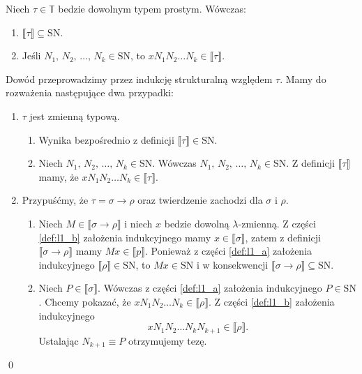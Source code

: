 \begin{lemat}\label{thm:sn_lemat1}
  Niech \(\tau\in\mathbb{T}\) bedzie dowolnym typem prostym. Wówczas:
  \begin{enumerate}[label=(\arabic*)]
    \setlength\itemsep{0em}
    \item \(\llbracket \tau \rrbracket  \subseteq \mathrm{SN}\).\label{def:l1_a}
    \item Jeśli \(N_1,\,N_2,\,\dots,\,N_k\in\mathrm{SN}\), to \(xN_1 N_2 \dots N_k \in \llbracket \tau \rrbracket\).\label{def:l1_b}
  \end{enumerate}
\end{lemat}
\begin{dowod}
  Dowód przeprowadzimy przez indukcję strukturalną względem \(\tau\). Mamy do rozważenia następujące dwa przypadki:
  \begin{enumerate}[label=(\alph*)]
    \setlength\itemsep{0em}
    \item \(\tau\) jest zmienną typową.
     \begin{enumerate}[label=(\arabic*)]
      \setlength\itemsep{0em}
     
        \item Wynika bezpośrednio z definicji \(\llbracket \tau \rrbracket\in \mathrm{SN}\). 
         
        \item Niech \(N_1,\,N_2,\,\dots,\,N_k \in \mathrm{SN}\). Wówczas \(N_1,\,N_2,\,\dots,\,N_k\in\mathrm{SN}\). Z definicji \(\llbracket \tau \rrbracket\) mamy, że \(xN_1 N_2 \dots N_k \in\llbracket \tau \rrbracket\).
      \end{enumerate}

    \item Przypuśćmy, że \(\tau=\sigma\to\rho\) oraz twierdzenie zachodzi dla \(\sigma\) i \(\rho\).
    \begin{enumerate}[label=(\arabic*)]
    \setlength\itemsep{0em}

    \item Niech \(M\in\llbracket \sigma \to \rho\rrbracket\) i niech \(x\) bedzie dowolną \(\lambda\)-zmienną. Z części \ref{def:l1_b} założenia indukcyjnego mamy \(x\in\llbracket \sigma \rrbracket\), zatem z definicji \(\llbracket \sigma\to\rho\rrbracket\) mamy \(Mx\in\llbracket p\rrbracket\). Ponieważ z części \ref{def:l1_a} założenia indukcyjnego \(\llbracket\rho\rrbracket\in\mathrm{SN}\), to \(Mx\in\mathrm{SN}\) i w konsekwencji \(\llbracket\sigma\to\rho\rrbracket\subseteq \mathrm{SN}\).
    \item Niech \(P\in\llbracket \sigma \rrbracket\). Wówczas z części \ref{def:l1_a} założenia indukcyjnego \(P\in\mathrm{SN}\). Chcemy pokazać, że \(xN_1 N_2 \dots N_k \in \llbracket \rho \rrbracket\). Z części \ref{def:l1_b} założenia indukcyjnego \[xN_1 N_2 \dots N_k N_{k+1} \in \llbracket \rho \rrbracket.\] Ustalając \(N_{k+1}\equiv P\) otrzymujemy tezę.
     \end{enumerate}
  \end{enumerate}
  \qed
\end{dowod}


